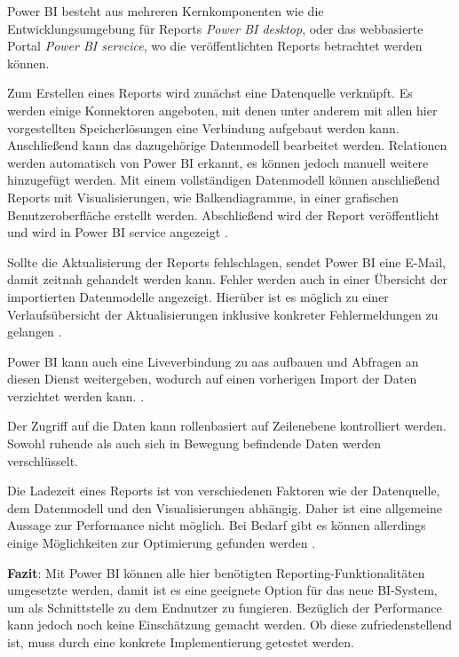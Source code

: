Power BI besteht aus mehreren Kernkomponenten wie die Entwicklungsumgebung für Reports \textit{Power BI desktop}, oder das webbasierte Portal \textit{Power BI servcice}, wo die veröffentlichten Reports betrachtet werden können.

Zum Erstellen eines Reports wird zunächst eine Datenquelle verknüpft. Es werden einige Konnektoren angeboten, mit denen unter anderem mit allen hier vorgestellten Speicherlösungen eine Verbindung aufgebaut werden kann. Anschließend kann das dazugehörige Datenmodell bearbeitet werden. Relationen werden automatisch von Power BI erkannt, es können jedoch manuell weitere hinzugefügt werden. Mit einem vollständigen Datenmodell können anschließend Reports mit Visualisierungen, wie Balkendiagramme, in einer grafischen Benutzeroberfläche erstellt werden. Abschließend wird der Report veröffentlicht und wird in Power BI service angezeigt \cite{how_beyond_2020}.

Sollte die Aktualisierung der Reports fehlschlagen, sendet Power BI eine E-Mail, damit zeitnah gehandelt werden kann. Fehler werden auch in einer Übersicht der importierten Datenmodelle angezeigt. Hierüber ist es möglich zu einer Verlaufsübersicht der Aktualisierungen inklusive konkreter Fehlermeldungen zu gelangen \cite{iseminger_data_2021}.

Power BI kann auch eine Liveverbindung zu \ac{aas} aufbauen und Abfragen an diesen Dienst weitergeben, wodurch auf einen vorherigen Import der Daten verzichtet werden kann.
\cite{how_beyond_2020}.

Der Zugriff auf die Daten kann rollenbasiert auf Zeilenebene kontrolliert werden. Sowohl ruhende als auch sich in Bewegung befindende Daten werden verschlüsselt.

Die Ladezeit eines Reports ist von verschiedenen Faktoren wie der Datenquelle, dem Datenmodell und den Visualisierungen abhängig. Daher ist eine allgemeine Aussage zur Performance nicht möglich. Bei Bedarf gibt es können allerdings einige Möglichkeiten zur Optimierung gefunden werden \cite[vgl.][]{myers_optimization_2021}.

\textbf{Fazit}: Mit Power BI können alle hier benötigten Reporting-Funktionalitäten umgesetzte werden, damit ist es eine geeignete Option für das neue BI-System, um als Schnittstelle zu dem Endnutzer zu fungieren. Bezüglich der Performance kann jedoch noch keine Einschätzung gemacht werden. Ob diese zufriedenstellend ist, muss durch eine konkrete Implementierung getestet werden.


